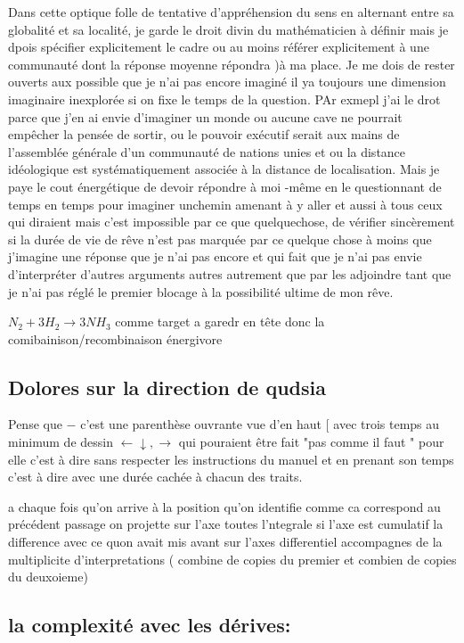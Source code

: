 \documentclass{article}
\begin{document}
Dans cette  optique folle de tentative d'appréhension du sens en alternant entre sa globalité et sa localité, je garde le droit divin du mathématicien à définir mais je dpois spécifier explicitement le cadre  ou au moins référer explicitement à une communauté dont la réponse moyenne répondra )à ma place.
Je me dois de rester ouverts aux possible que je n'ai pas encore imaginé il ya toujours une dimension imaginaire inexplorée si on fixe le temps de la question.
PAr exmepl j'ai le drot parce que j'en ai envie d'imaginer un monde ou aucune cave ne pourrait empêcher la pensée de sortir, ou le pouvoir exécutif serait aux mains de l'assemblée générale d'un communauté de nations unies et ou la distance idéologique est systématiquement associée à la distance de localisation. Mais je paye le cout énergétique de devoir répondre à moi -même en le questionnant de temps en temps pour imaginer unchemin amenant à y aller et aussi à tous ceux qui diraient mais c'est impossible par ce que quelquechose, de vérifier sincèrement si la durée de vie de rêve n'est pas marquée par ce quelque chose à moins que j'imagine une réponse que je n'ai pas encore et qui fait que je n'ai pas envie d'interpréter d'autres arguments autres autrement que par les adjoindre tant que je n'ai pas réglé le premier blocage à la possibilité ultime de mon rêve.   
 
 $N_2+3H_2 \rightarrow 3 NH_3$  comme target a garedr en tête donc la comibainison/recombinaison énergivore
 
 
\subsection{Dolores sur la direction de qudsia }
 
 Pense que $-$ c'est une parenthèse ouvrante vue d'en haut $[$ avec trois temps au minimum de dessin $\leftarrow \downarrow,\rightarrow$  qui pouraient être fait "pas comme il faut " pour elle c'est à dire sans respecter les instructions du manuel et en prenant son temps  c'est à dire avec une durée cachée à chacun des traits.
 
 
 a chaque fois qu'on arrive à la position qu'on identifie comme ca correspond au précédent passage on projette sur l'axe toutes l'ntegrale si l'axe est cumulatif la difference avec ce quon avait mis  avant sur l'axes differentiel accompagnes de la multiplicite d'interpretations ( combine de copies du premier et combien de copies du deuxoieme)
 
 \subsection{la complexité avec les dérives:} 
 
\end{document}
